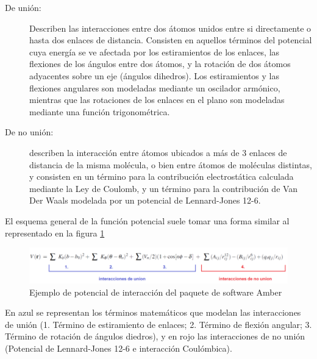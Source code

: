 \begin{description}
 \item [De unión:] Describen las interacciones entre dos átomos unidos entre si directamente o hasta dos enlaces de distancia. 
 Consisten en aquellos términos del potencial cuya energía se ve afectada por los estiramientos de los enlaces, las flexiones de los ángulos entre dos átomos, y la rotación de dos átomos adyacentes sobre un eje (ángulos dihedros). Los estiramientos y las flexiones angulares son modeladas mediante un oscilador armónico, mientras que las rotaciones de los enlaces en el plano son modeladas mediante una función trigonométrica.

\item [De no unión:] describen la interacción entre átomos ubicados a más de 3 enlaces de distancia de la misma molécula, o bien entre átomos de moléculas distintas, y consisten en un término para la
contribución electrostática calculada mediante la Ley de Coulomb, y un término para la contribución de Van Der Waals modelada por un potencial de Lennard-Jones 12-6.


\end{description}



El esquema general de la función potencial suele tomar una forma similar al representado en la figura \ref{potencialAmber} \\
\begin{figure}[!ht]
\includegraphics[keepaspectratio, width=\textwidth]{img/md/ecPotencialAmber.png}
\caption{Ejemplo de potencial de interacción del paquete de software Amber}
\label{potencialAmber}
\end{figure}

En azul se representan los términos matemáticos que modelan las interacciones de unión (1. Término de estiramiento de enlaces; 2. Término de flexión angular; 3. Término de rotación de ángulos diedros), y en rojo
las interacciones de no unión (Potencial de Lennard-Jones 12-6 e interacción Coulómbica).

